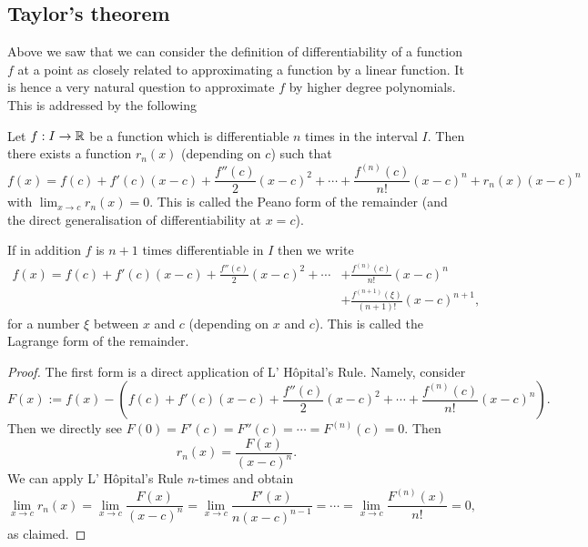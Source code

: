 \documentclass[10pt, a4paper]{article}
\newcommand{\lhopital}[0]{L' H\^opital}
\begin{document}
\subsection{Taylor's theorem}

Above we saw that we can consider the definition of differentiability of a function $f$ at a point as closely related to approximating a function by a linear function.
It is hence a very natural question to approximate $f$ by higher degree polynomials.
This is addressed by the following
\begin{theorem}\label{pre:analy:thm:taylorsthm}
    Let $f : I \rightarrow \mathbb{R}$ be a function which is differentiable $n$ times in the interval $I$.
    Then there exists a function $r_n(x)$
    (depending on $c$)
    such that
    \begin{equation}
        f(x) = f(c) + f'(c)(x - c) + \frac{f''(c)}{2}(x - c) ^ 2 + \dotsi + \frac{f ^ {(n)}(c)}{n!}(x - c) ^ n + r_n(x)(x - c) ^ n
    \end{equation}
    with $\lim_{x \rightarrow c}r_n(x) = 0$.
    This is called the Peano form of the remainder
    (and the direct generalisation of differentiability at $x = c$).

    If in addition $f$ is $n + 1$ times differentiable in $I$ then we write
    \begin{align*}
        f(x) = f(c) + f'(c)(x - c) + \frac{f''(c)}{2}(x - c) ^ 2 + \dotsi &+ \frac{f ^ {(n)}(c)}{n!}(x - c) ^ n \\
        &+ \frac{f ^ {(n + 1)}(\xi)}{(n + 1)!}(x - c) ^ {n + 1},
    \end{align*}
    for a number $\xi$ between $x$ and $c$
    (depending on $x$ and $c$).
    This is called the Lagrange form of the remainder.
    \begin{proof}
        The first form is a direct application of \lhopital's Rule.
        Namely,
        consider
        \[
        F(x) := f(x) - \left(f(c) + f'(c)(x - c) + \frac{f''(c)}{2}(x - c) ^ 2 + \dotsi + \frac{f ^ {(n)}(c)}{n!}(x - c) ^ n\right).
        \]
        Then we directly see $F(0) = F'(c) = F''(c) = \dotsi = F ^ {(n)}(c) = 0$.
        Then
        \[
        r_n(x) = \frac{F(x)}{(x - c) ^ n}.
        \]
        We can apply \lhopital's Rule $n$-times and obtain
        \[
        \lim_{x \rightarrow c}r_n(x) = \lim_{x \rightarrow c}\frac{F(x)}{(x - c) ^ n} = \lim_{x \rightarrow c}\frac{F'(x)}{n(x - c) ^ {n - 1}} = \dotsi = \lim_{x \rightarrow c}\frac{F ^ {(n)}(x)}{n!} = 0,
        \]
        as claimed.


\end{proof}
\end{theorem}
\end{document}
